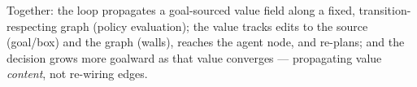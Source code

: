 \documentclass[11pt]{article}
\begin{document}
\noindent Together: the loop propagates a goal-sourced value field along a fixed, transition-respecting graph
(policy evaluation); the value tracks edits to the source (goal/box) and the graph (walls), reaches the agent
node, and re-plans; and the decision grows more goalward as that value converges --- propagating value
\emph{content}, not re-wiring edges.
\end{document}
